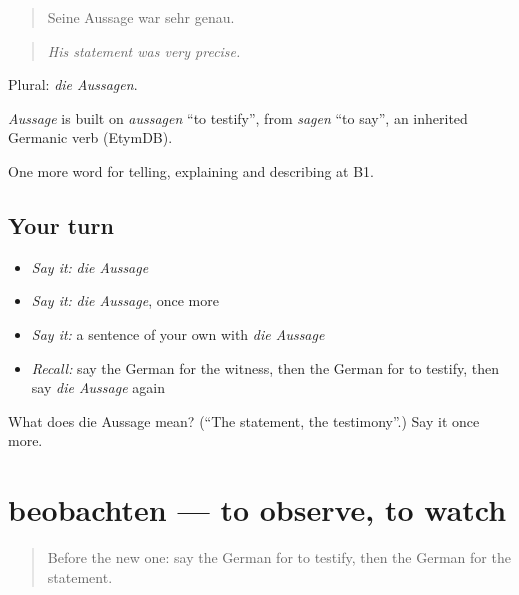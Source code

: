 \begin{quote}
Seine Aussage war sehr genau.
\end{quote}

\begin{quote}
\emph{His statement was very precise.}
\end{quote}

Plural: \emph{die Aussagen}.

\begin{cousinweb}
\emph{Aussage} is built on \emph{aussagen} \textquotedblleft{}to testify\textquotedblright{}, from \emph{sagen} \textquotedblleft{}to say\textquotedblright{}, an inherited Germanic verb (EtymDB).
\end{cousinweb}

\begin{grammarlens}[title={What you've built}]
One more word for telling, explaining and describing at B1.
\end{grammarlens}

\subsection*{Your turn}
\begin{itemize}
\raggedright
  \item \emph{Say it:} \emph{die Aussage}
  \item \emph{Say it:} \emph{die Aussage}, once more
  \item \emph{Say it:} a sentence of your own with \emph{die Aussage}
  \item \emph{Recall:} say the German for the witness, then the German for to testify, then say \emph{die Aussage} again
\end{itemize}

\begin{tcolorbox}[breakable,colback=teal!4,colframe=teal!35!black,title={Before you move on}]
What does die Aussage mean? (\textquotedblleft{}The statement, the testimony\textquotedblright{}.) Say it once more.
\end{tcolorbox}
\section[beobachten]{beobachten — to observe, to watch}

\label{lesson:GE-C283-beobachten}



\begin{quote}
Before the new one: say the German for to testify, then the German for the statement.
\end{quote}

